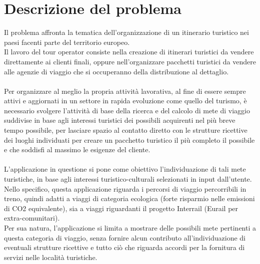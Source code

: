 \documentclass[12pt, a4paper]{article}
\begin{document}
	\newpage
	\section{Descrizione del problema}
	Il problema affronta la tematica dell'organizzazione di un itinerario turistico nei paesi facenti parte del territorio europeo.\\Il lavoro del tour operator consiste nella creazione di itinerari turistici da vendere direttamente ai clienti finali, oppure nell'organizzare pacchetti turistici da vendere alle agenzie di viaggio che si occuperanno della distribuzione al dettaglio.\\\\Per organizzare al meglio la propria attività lavorativa, al fine di essere sempre attivi e aggiornati in un settore in rapida evoluzione come quello del turismo, è necessario svolgere l'attività di base della ricerca e del calcolo di mete di viaggio suddivise in base agli interessi turistici dei possibili acquirenti nel più breve tempo possibile, per lasciare spazio al contatto diretto con le strutture ricettive dei luoghi individuati per creare un pacchetto turistico il più completo il possibile e che soddisfi al massimo le esigenze del cliente.
	\\\\L'applicazione in questione si pone come obiettivo l'individuazione di tali mete turistiche, in base agli interessi turistico-culturali selezionati in input dall'utente.\\Nello specifico, questa applicazione riguarda i percorsi di viaggio percorribili in treno, quindi adatti a viaggi di categoria ecologica (forte risparmio nelle emissioni di CO2 equivalente), sia a viaggi riguardanti il progetto Interrail (Eurail per extra-comunitari).\\Per sua natura, l'applicazione si limita a mostrare delle possibili mete pertinenti a questa categoria di viaggio, senza fornire alcun contributo all'individuazione di eventuali strutture ricettive e tutto ciò che riguarda accordi per la fornitura di servizi nelle località turistiche.
	\newpage
\end{document}
